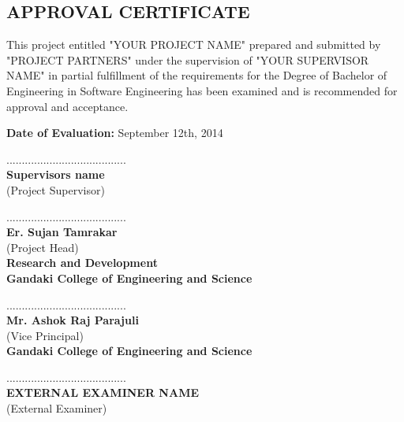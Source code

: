 \begin{center}
		\section*{APPROVAL CERTIFICATE}
\end{center}
		This project entitled "YOUR PROJECT NAME" prepared and submitted by "PROJECT PARTNERS" under the supervision of "YOUR SUPERVISOR NAME" in partial fulfillment of the requirements for the Degree of Bachelor of Engineering in Software Engineering has been examined and is recommended for approval and acceptance.
\vskip0.1cm


\textbf{Date of Evaluation:} September 12th, 2014
\vskip0.5cm
	

....................................... \\
	\textbf{Supervisors name} \\
	(Project Supervisor)
	\vskip0.3cm
	
....................................... \\
\textbf{Er. Sujan Tamrakar} \\
(Project Head) \\
\textbf{Research and Development} \\
\textbf{Gandaki College of Engineering and Science}
\vskip0.3cm

....................................... \\
\textbf{Mr. Ashok Raj Parajuli} \\
(Vice Principal) \\
\textbf{Gandaki College of Engineering and Science}
\vskip0.3cm

....................................... \\
\textbf{EXTERNAL EXAMINER NAME} \\
(External Examiner) \\